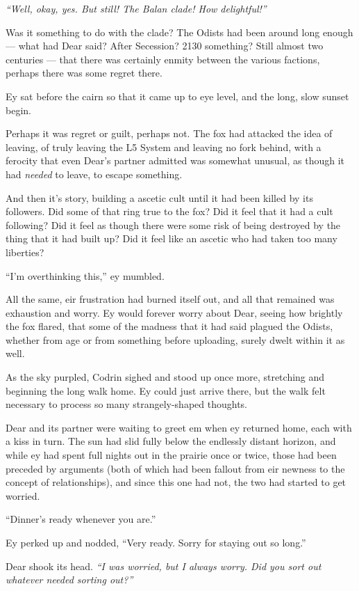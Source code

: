 \emph{``Well, okay, yes. But still! The Balan clade! How delightful!''}

Was it something to do with the clade? The Odists had been around long enough — what had Dear said? After Secession? 2130 something? Still almost two centuries — that there was certainly enmity between the various factions, perhaps there was some regret there.

Ey sat before the cairn so that it came up to eye level, and the long, slow sunset begin.

Perhaps it was regret or guilt, perhaps not. The fox had attacked the idea of leaving, of truly leaving the L5 System and leaving no fork behind, with a ferocity that even Dear's partner admitted was somewhat unusual, as though it had \emph{needed} to leave, to escape something.

And then it's story, building a ascetic cult until it had been killed by its followers. Did some of that ring true to the fox? Did it feel that it had a cult following? Did it feel as though there were some risk of being destroyed by the thing that it had built up? Did it feel like an ascetic who had taken too many liberties?

``I'm overthinking this,'' ey mumbled.

All the same, eir frustration had burned itself out, and all that remained was exhaustion and worry. Ey would forever worry about Dear, seeing how brightly the fox flared, that some of the madness that it had said plagued the Odists, whether from age or from something before uploading, surely dwelt within it as well.

As the sky purpled, Codrin sighed and stood up once more, stretching and beginning the long walk home. Ey could just arrive there, but the walk felt necessary to process so many strangely-shaped thoughts.

Dear and its partner were waiting to greet em when ey returned home, each with a kiss in turn. The sun had slid fully below the endlessly distant horizon, and while ey had spent full nights out in the prairie once or twice, those had been preceded by arguments (both of which had been fallout from eir newness to the concept of relationships), and since this one had not, the two had started to get worried.

``Dinner's ready whenever you are.''

Ey perked up and nodded, ``Very ready. Sorry for staying out so long.''

Dear shook its head. \emph{``I was worried, but I always worry. Did you sort out whatever needed sorting out?''}


